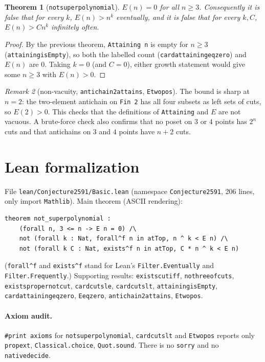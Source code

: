 \documentclass[11pt]{article}
\newtheorem{theorem}{Theorem}
\theoremstyle{definition}
\theoremstyle{remark}
\newtheorem{remark}[theorem]{Remark}
\renewcommand{\_}{\oldus\allowbreak}
\begin{document}
\begin{theorem}[\texttt{not\_superpolynomial}]
$E(n) = 0$ for all $n \ge 3$. Consequently it is false that for every $k$, $E(n) > n^k$ eventually, and
it is false that for every $k, C$, $E(n) > C n^k$ infinitely often.
\end{theorem}

\begin{proof}
By the previous theorem, \texttt{Attaining n} is empty for $n \ge 3$ (\texttt{attaining\_isEmpty}), so
both the labelled count (\texttt{card\_attaining\_eq\_zero}) and $E(n)$ are $0$. Taking $k = 0$ (and
$C = 0$), either growth statement would give some $n \ge 3$ with $E(n) > 0$.
\end{proof}

\begin{remark}[non-vacuity, \texttt{antichain2\_attains}, \texttt{E\_two\_pos}]
The bound is sharp at $n = 2$: the two-element antichain on \texttt{Fin 2} has all four subsets as left
sets of cuts, so $E(2) > 0$. This checks that the definitions of \texttt{Attaining} and $E$ are not
vacuous. A brute-force check also confirms that no poset on $3$ or $4$ points has $2^n$ cuts and that
antichains on $3$ and $4$ points have $n + 2$ cuts.
\end{remark}

\section{Lean formalization}

File \texttt{lean/Conjecture2591/Basic.lean} (namespace \texttt{Conjecture2591}, 206 lines, only import
\texttt{Mathlib}). Main theorem (ASCII rendering):
\begin{verbatim}
theorem not_superpolynomial :
    (forall n, 3 <= n -> E n = 0) /\
    not (forall k : Nat, forall^f n in atTop, n ^ k < E n) /\
    not (forall k C : Nat, exists^f n in atTop, C * n ^ k < E n)
\end{verbatim}
(\texttt{forall\^{}f} and \texttt{exists\^{}f} stand for Lean's \texttt{Filter.Eventually} and
\texttt{Filter.Frequently}.) Supporting results: \texttt{exists\_cut\_iff}, \texttt{no\_three\_of\_cuts},
\texttt{exists\_proper\_not\_cut}, \texttt{card\_cuts\_le}, \texttt{card\_cuts\_lt},
\texttt{attaining\_isEmpty}, \texttt{card\_attaining\_eq\_zero}, \texttt{E\_eq\_zero},
\texttt{antichain2\_attains}, \texttt{E\_two\_pos}.

\paragraph{Axiom audit.} \texttt{\#print axioms} for \texttt{not\_superpolynomial},
\texttt{card\_cuts\_lt} and \texttt{E\_two\_pos} reports only \texttt{propext}, \texttt{Classical.choice},
\texttt{Quot.sound}. There is no \texttt{sorry} and no \texttt{native\_decide}.
\end{document}
